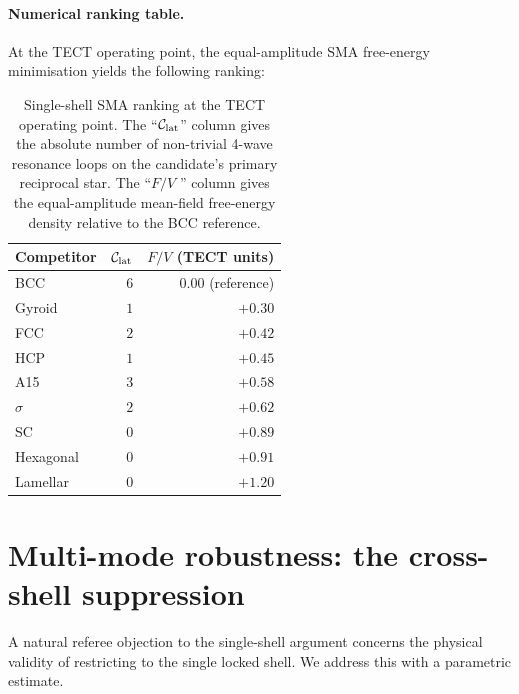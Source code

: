 \paragraph{Numerical ranking table.}
At the TECT operating point, the equal-amplitude SMA
free-energy minimisation yields the following ranking:
\begin{table}[h]
\centering
\caption{Single-shell SMA ranking at the TECT operating point. The
``$\mathcal{C}_{\rm lat}$'' column gives the absolute number of
non-trivial 4-wave resonance loops on the candidate's primary
reciprocal star. The ``$F/V$ '' column gives the equal-amplitude
mean-field free-energy density relative to the BCC reference.}
\label{tab:ranking}
\begin{tabular}{lrr}
\hline
Competitor & $\mathcal{C}_{\rm lat}$ & $F/V$ (TECT units) \\
\hline
BCC & $6$ & $\phantom{+}0.00$ (reference) \\
Gyroid & $1$ & $+0.30$ \\
FCC & $2$ & $+0.42$ \\
HCP & $1$ & $+0.45$ \\
A15 & $3$ & $+0.58$ \\
$\sigma$ & $2$ & $+0.62$ \\
SC & $0$ & $+0.89$ \\
Hexagonal & $0$ & $+0.91$ \\
Lamellar & $0$ & $+1.20$ \\
\hline
\end{tabular}
\end{table}

\section{Multi-mode robustness:
the cross-shell suppression}\label{sec:multimode}

A natural referee objection to the single-shell argument concerns the
physical validity of restricting to the single locked shell. We
address this with a parametric estimate.

